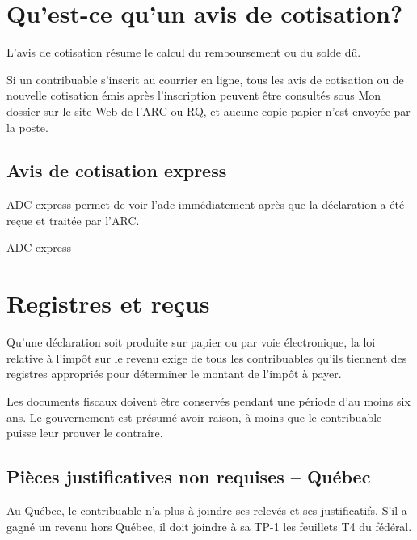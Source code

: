 \section{Qu'est-ce qu'un avis de cotisation?}
\begin{intro}
	L'avis de cotisation résume le calcul du remboursement ou du solde dû.
\end{intro}
\begin{note}
	Si un contribuable s'inscrit au courrier en ligne, tous les avis de cotisation ou de nouvelle cotisation émis après l'inscription peuvent être consultés sous Mon dossier sur le site Web de l'ARC ou RQ, et aucune copie papier n'est envoyée par la poste.
\end{note}


\subsection{Avis de cotisation express}
ADC express permet de voir l'\acrfull{adc} immédiatement après que la déclaration a été reçue et traitée par l'ARC.

\cat\href{https://www.canada.ca/fr/agence-revenu/services/services-electroniques/a-propos-express.html}{ADC express}



\section{Registres et reçus}
\begin{intro}
	Qu'une déclaration soit produite sur papier ou par voie électronique, la loi relative à l'impôt sur le revenu exige de tous les contribuables qu'ils tiennent des registres appropriés pour déterminer le montant de l'impôt à payer.
\end{intro}
Les documents fiscaux doivent être conservés pendant une période d'au moins six ans. Le gouvernement \cat \qct est présumé avoir raison, à moins que le contribuable puisse leur prouver le contraire.


\subsection{Pièces justificatives non requises – Québec}
Au Québec, le contribuable n'a plus à joindre ses relevés et ses justificatifs. S'il a gagné un revenu hors Québec, il doit joindre à sa TP-1 les feuillets T4 du fédéral.



